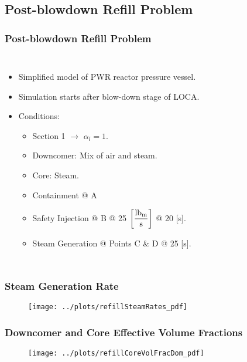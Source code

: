 \documentclass[compress,xcolor=table]{beamer}
\begin{document}
\subsection[Post-blowdown Refill Problem]{Post-blowdown Refill Problem}
\begin{frame}
\frametitle{Post-blowdown Refill Problem}
\begin{columns}
\begin{itemize}
\item{Simplified model of PWR reactor pressure vessel.}
\item{Simulation starts after blow-down stage of LOCA.}
\item{Conditions:
\begin{itemize}
\item{Section 1 $\rightarrow$ $\alpha_{l} = 1$.}
\item{Downcomer: Mix of air and steam.}
\item{Core: Steam.}
\item{Containment @ A}
\item{Safety Injection @ B @ 25 $\displaystyle \left[ \frac{\lbm{}}{\text{s}} \right]$ @ 20 [s].}
\item{Steam Generation @ Points C \& D @ 25 [s].}
\end{itemize}
}
\end{itemize}


\begin{figure}[h!t]
\centering
\resizebox{!}{0.65\textheight}{}
\end{figure}
\end{columns}

\end{frame}
\begin{frame}
\frametitle{Steam Generation Rate}

\begin{figure}[h!t]
\centering
\texttt{[image: ../plots/refillSteamRates\_pdf]}
\end{figure}

\end{frame}
\begin{frame}
\frametitle{Downcomer and Core Effective Volume Fractions}

\begin{figure}[h!t]
\centering
\texttt{[image: ../plots/refillCoreVolFracDom\_pdf]}
\end{figure}

\end{frame}
\end{document}
